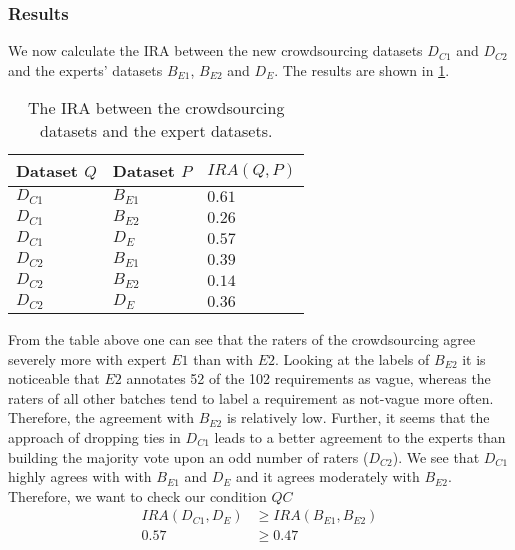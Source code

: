 \subsubsection{Results}
We now calculate the \ac{IRA} between the new crowdsourcing datasets $D_{C1}$ and $D_{C2}$ and the experts' datasets $B_{E1}$, $B_{E2}$ and $D_{E}$.
The results are shown in \cref{tab:study:objects:crowdsourcing:batches:IRA:majority}.
\pagebreak %
\begin{table}[htpb]
    \centering
    \begin{tabular}{l l l}
        \toprule
        Dataset $Q$ & Dataset $P$ & $IRA(Q, P)$ \\
        \midrule
        $D_{C1}$ & $B_{E1}$ & $0.61$\\
        $D_{C1}$ & $B_{E2}$ & $0.26$\\
        $D_{C1}$ & $D_{E}$ & $0.57$\\
        $D_{C2}$ & $B_{E1}$ & $0.39$\\
        $D_{C2}$ & $B_{E2}$ & $0.14$\\
        $D_{C2}$ & $D_{E}$ & $0.36$\\
        \bottomrule
    \end{tabular}
    \caption[Inter rater agreement between crowdsourcing datasets and expert datasets]{The \ac{IRA} between the crowdsourcing datasets and the expert datasets.}\label{tab:study:objects:crowdsourcing:batches:IRA:majority}
\end{table}

From the table above one can see that the raters of the crowdsourcing agree severely more with expert $E1$ than with $E2$.
Looking at the labels of $B_{E2}$ it is noticeable that $E2$ annotates 52 of the 102 requirements as vague, whereas the raters of all other batches tend to label a requirement as not-vague more often.
Therefore, the agreement with $B_{E2}$ is relatively low.
Further, it seems that the approach of dropping ties in $D_{C1}$ leads to a better agreement to the experts than building the majority vote upon an odd number of raters ($D_{C2}$).
We see that $D_{C1}$ highly agrees with with $B_{E1}$ and $D_{E}$ and it agrees moderately with $B_{E2}$.
Therefore, we want to check our condition $QC$
\begin{equation}
    \begin{aligned}
        IRA(D_{C1}, D_E) &\ge IRA(B_{E1}, B_{E2})\\
        0.57 &\ge 0.47
    \end{aligned}
\end{equation}

